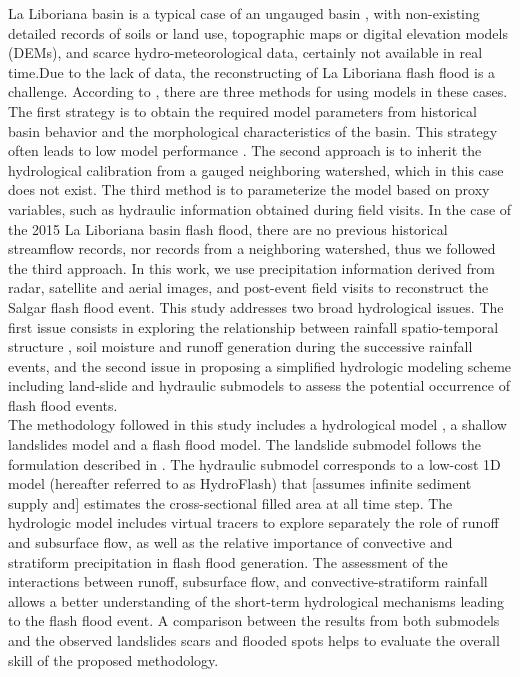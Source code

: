 \documentclass[hess, manuscript]{copernicus}
\begin{document}
La Liboriana basin is a typical case of an ungauged basin  \citep{Sivapalan2013, Seibert2009, Beven2007, Bonell2006, Yamanaka2017}, with non-existing detailed records of soils or land use, topographic maps or digital elevation models (DEMs), and scarce hydro-meteorological data, certainly not available in real time.Due to the lack of data, the reconstructing of La Liboriana flash flood is a challenge. According to \citet{blschl2012}, there are three methods for using models in these cases. The first strategy is to obtain the required model parameters from historical basin behavior and the morphological characteristics of the basin. This strategy often leads to low model performance \citep{Duan2006}. The second approach is to inherit the hydrological calibration from a gauged neighboring watershed, which in this case does not exist. The third method is to parameterize the model based on proxy variables, such as hydraulic information obtained during field visits. In the case of the 2015 La Liboriana basin flash flood, there are no previous historical streamflow records, nor records from a neighboring watershed, thus we followed the third approach. In this work, we use precipitation information derived from radar, satellite and aerial images, and post-event field visits to reconstruct the Salgar flash flood event. This study addresses two broad hydrological issues. The first issue consists in exploring the relationship between rainfall spatio-temporal structure \citep{Llasat2016,Fragoso2012}, soil moisture and runoff generation \citep{Penna2011,Tramblay2012b,Garambois2013} during the successive rainfall events, and the second issue in proposing a simplified hydrologic modeling scheme including land-slide and hydraulic submodels to assess the potential occurrence of flash flood events.\\

The methodology followed in this study includes a hydrological model \citep{Velez2001, Frances2007b}, a shallow landslides model and a flash flood model. The landslide submodel follows the formulation described in \citep{Aristizabal2016}. The hydraulic submodel corresponds to a low-cost 1D model (hereafter referred to as HydroFlash) that [assumes infinite sediment supply and] estimates the cross-sectional filled area at all time step. The hydrologic model includes virtual tracers to explore separately the role of runoff and subsurface flow, as well as the relative importance of convective and stratiform precipitation in flash flood generation. The assessment of the interactions between runoff, subsurface flow, and convective-stratiform rainfall allows a better understanding of the short-term hydrological mechanisms leading to the flash flood event.  A comparison between the results from both submodels and the observed landslides scars and flooded spots helps to evaluate the overall skill of the proposed methodology. \\
\end{document}
